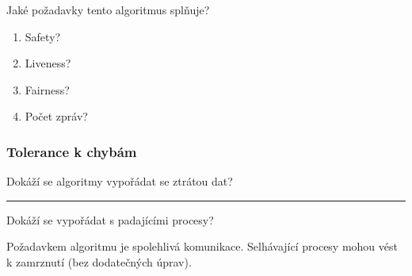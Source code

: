 \documentclass[usenames,dvipsnames,9pt]{beamer}
\begin{document}
\begin{frame}

\begin{center}
\Large Jaké požadavky tento algoritmus splňuje?
\end{center}

\begin{minipage}{0.4\linewidth}
  \begin{enumerate}
  \item Safety? \uncover<2->{\textcolor{green}{TRUE}}
  \item Liveness? 
  \item Fairness? 
  \item Počet zpráv? 
  \end{enumerate}
\end{minipage}
\hfill
\begin{minipage}{0.5\linewidth}
\end{minipage}

\end{frame}

\begin{frame}
\frametitle{Tolerance k chybám}

\begin{center}
\Large Dokáží se algoritmy vypořádat se ztrátou dat?
\end{center}
\pause\vspace{1em}\hrule\vspace{1em}

\begin{center}
\Large Dokáží se vypořádat s padajícími procesy?
\end{center}

\pause \vspace{1em}

\faWarning Požadavkem algoritmu je spolehlivá komunikace. Selhávající procesy mohou vést k zamrznutí (bez dodatečných úprav).

\end{frame}
\end{document}
